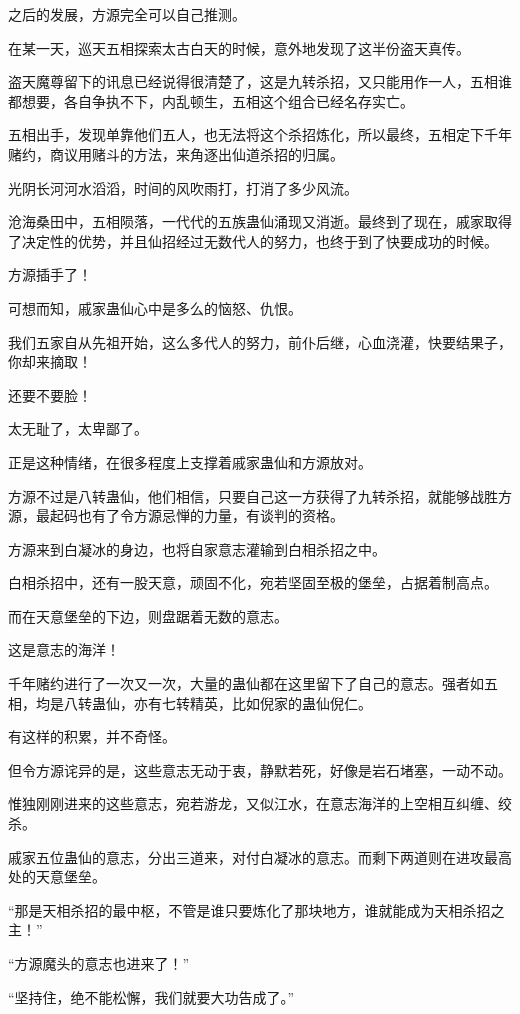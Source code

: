 \begin{this_body}
之后的发展，方源完全可以自己推测。

在某一天，巡天五相探索太古白天的时候，意外地发现了这半份盗天真传。

盗天魔尊留下的讯息已经说得很清楚了，这是九转杀招，又只能用作一人，五相谁都想要，各自争执不下，内乱顿生，五相这个组合已经名存实亡。

五相出手，发现单靠他们五人，也无法将这个杀招炼化，所以最终，五相定下千年赌约，商议用赌斗的方法，来角逐出仙道杀招的归属。

光阴长河河水滔滔，时间的风吹雨打，打消了多少风流。

沧海桑田中，五相陨落，一代代的五族蛊仙涌现又消逝。最终到了现在，戚家取得了决定性的优势，并且仙招经过无数代人的努力，也终于到了快要成功的时候。

方源插手了！

可想而知，戚家蛊仙心中是多么的恼怒、仇恨。

我们五家自从先祖开始，这么多代人的努力，前仆后继，心血浇灌，快要结果子，你却来摘取！

还要不要脸！

太无耻了，太卑鄙了。

正是这种情绪，在很多程度上支撑着戚家蛊仙和方源放对。

方源不过是八转蛊仙，他们相信，只要自己这一方获得了九转杀招，就能够战胜方源，最起码也有了令方源忌惮的力量，有谈判的资格。

方源来到白凝冰的身边，也将自家意志灌输到白相杀招之中。

白相杀招中，还有一股天意，顽固不化，宛若坚固至极的堡垒，占据着制高点。

而在天意堡垒的下边，则盘踞着无数的意志。

这是意志的海洋！

千年赌约进行了一次又一次，大量的蛊仙都在这里留下了自己的意志。强者如五相，均是八转蛊仙，亦有七转精英，比如倪家的蛊仙倪仁。

有这样的积累，并不奇怪。

但令方源诧异的是，这些意志无动于衷，静默若死，好像是岩石堵塞，一动不动。

惟独刚刚进来的这些意志，宛若游龙，又似江水，在意志海洋的上空相互纠缠、绞杀。

戚家五位蛊仙的意志，分出三道来，对付白凝冰的意志。而剩下两道则在进攻最高处的天意堡垒。

“那是天相杀招的最中枢，不管是谁只要炼化了那块地方，谁就能成为天相杀招之主！”

“方源魔头的意志也进来了！”

“坚持住，绝不能松懈，我们就要大功告成了。”


\end{this_body}
